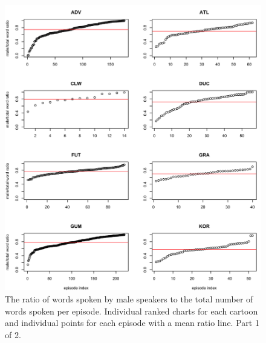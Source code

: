 \documentclass[a4paper, 11pt]{article}
\begin{document}
\begin{figure}[t!]
  \includegraphics[width=\linewidth]{figures/variance1.png}
  \caption{The ratio of words spoken by male speakers to the total number of words spoken per episode. Individual ranked charts for each cartoon and individual points for each episode with a mean ratio line. Part 1 of 2.}
  \label{fig:variance1}
\end{figure}
\end{document}
